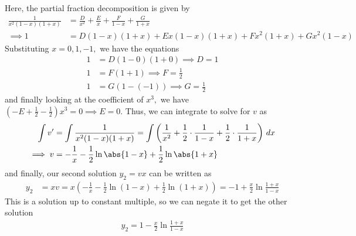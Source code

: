 \documentclass{article}
\begin{document}
\begin{enumerate}
\begin{soln}
			Here, the partial fraction decomposition is given by
			\begin{align*}
				\frac{1}{x^2(1-x)(1+x)} &= \frac{D}{x^2} + \frac{E}{x} + \frac{F}{1-x} + \frac{G}{1+x} \\
				\implies 1 &= D(1-x)(1+x) + Ex(1-x)(1+x) + Fx^2(1+x) + Gx^2(1-x)
			\end{align*}
			Substituting $x=0, 1, -1,$ we have the equations
			\begin{align*}
				1 &= D(1-0)(1+0) \implies D = 1 \\
				1 &= F(1+1) \implies F = \frac{1}{2} \\
				1 &= G(1-(-1)) \implies G = \frac{1}{2}
			\end{align*}
			and finally looking at the coefficient of $x^3,$ we have $\left( -E + \frac{1}{2} - \frac{1}{2} \right)x^3 = 0\implies E = 0.$ Thus, we can integrate to solve for $v$ as
			\begin{align*}
				\int v' &= \int \frac{1}{x^2(1-x)(1+x)} = \int\left( \frac{1}{x^2} + \frac{1}{2}\cdot \frac{1}{1-x} + \frac{1}{2}\cdot\frac{1}{1+x} \right)\, dx \\
				\implies v &= -\frac{1}{x} - \frac{1}{2}\ln\abs{1-x} + \frac{1}{2}\ln\abs{1+x}
			\end{align*}
			and finally, our second solution $y_2=vx$ can be written as
			\begin{align*}
				y_2 &= xv = x\left( -\frac{1}{x} -\frac{1}{2}\ln(1-x) + \frac{1}{2}\ln(1+x) \right) = -1 + \frac{x}{2}\ln \frac{1+x}{1-x}
			\end{align*}
			This is a solution up to constant multiple, so we can negate it to get the other solution
			\begin{align*}
				y_2 = 1 - \frac{x}{2}\ln \frac{1+x}{1-x}
			\end{align*}
		\end{soln}


\end{enumerate}
\end{document}
